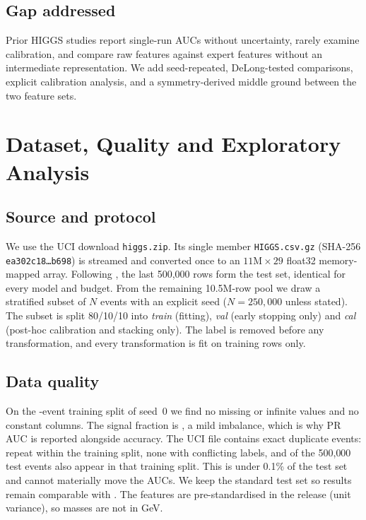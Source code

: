 \documentclass[conference]{IEEEtran}
\begin{document}
\subsection{Gap addressed}
Prior HIGGS studies report single-run AUCs without uncertainty, rarely examine calibration, and
compare raw features against expert features without an intermediate representation. We add
seed-repeated, DeLong-tested comparisons, explicit calibration analysis, and a symmetry-derived
middle ground between the two feature sets.

\section{Dataset, Quality and Exploratory Analysis}\label{sec:data}
\subsection{Source and protocol}
We use the UCI download \texttt{higgs.zip}. Its single member \texttt{HIGGS.csv.gz} (SHA-256
\texttt{ea302c18\ldots b698}) is streamed and converted once to an $11\text{M}\times29$ float32
memory-mapped array. Following \cite{baldi2014searching}, the last 500{,}000 rows form the test set,
identical for every model and budget. From the remaining 10.5M-row pool we draw a stratified subset
of $N$ events with an explicit seed ($N=250{,}000$ unless stated). The subset is split 80/10/10 into
\emph{train} (fitting), \emph{val} (early stopping only) and \emph{cal} (post-hoc calibration and
stacking only). The label is removed before any transformation, and every transformation is fit on
training rows only.

\subsection{Data quality}
On the \edaN-event training split of seed~0 we find no missing or infinite values and no constant
columns. The signal fraction is \edaSignal, a mild imbalance, which is why PR AUC is reported
alongside accuracy. The UCI file contains exact duplicate events: \edaDup{} repeat within the
training split, none with conflicting labels, and \edaOverlap{} of the 500{,}000 test events also
appear in that training split. This is under 0.1\% of the test set and cannot materially move the
AUCs. We keep the standard test set so results remain comparable with
\cite{baldi2014searching}. The features are pre-standardised in the release (unit variance), so
masses are not in GeV.
\end{document}
